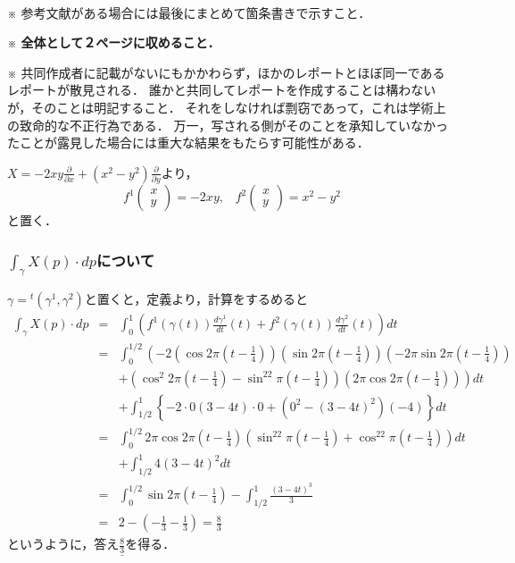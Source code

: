 \documentclass[dvipdfmx,nosetpagesize, uplatex]{jsarticle}
\theoremstyle{definition}
\theoremstyle{StatementsWithStar}
\theoremstyle{StatementsWithStar2}
\theoremstyle{StatementsWithStar3}
\theoremstyle{StatementsWithCCirc}
\theoremstyle{definition}
\begin{document}
\par
\ \par
\noindent
{\small
※ 参考文献がある場合には最後にまとめて箇条書きで示すこと．\par\noindent
※ \textbf{全体として２ページに収めること．}\par\noindent
※ 共同作成者に記載がないにもかかわらず，ほかのレポートとほぼ同一であるレポートが散見される．
誰かと共同してレポートを作成することは構わないが，そのことは明記すること．
それをしなければ剽窃であって，これは学術上の致命的な不正行為である．
万一，写される側がそのことを承知していなかったことが露見した場合には重大な結果をもたらす可能性がある．
}

\par
%
%
\noindent

$X=-2xy\frac{\partial}{\partial x}+(x^2-y^2)\frac{\partial}{\partial y}$より，
\[f^1\left(\begin{array}{c}x \\ y\end{array}\right)=-2xy,\;\;\; f^2\left(\begin{array}{c}x \\y\end{array}\right)=x^2-y^2\]
と置く．

\subsubsection*{$\int_{\gamma}X(p)\cdot dp$について}

$\gamma={}^t(\gamma^1,\gamma^2)$と置くと，定義より，計算をするめると
\begin{eqnarray*}
    \int_\gamma X(p)\cdot dp &=& \int^1_0 \left( f^1(\gamma(t))\frac{d\gamma^1}{dt}(t)+f^2(\gamma(t))\frac{d\gamma^2}{dt}(t) \right) dt \\
    &=& \int^{1/2}_0  \left( -2(\cos 2\pi(t-\frac{1}{4})) (\sin 2\pi(t-\frac{1}{4}))(-2\pi\sin 2\pi (t-\frac{1}{4})) \right.\\
    & & \left. + \left(\cos^2 2\pi (t-\frac{1}{4})-\sin^22\pi (t-\frac{1}{4}) \right) (2\pi\cos 2\pi (t-\frac{1}{4}))\right) dt \\
    & & + \int^1_{1/2} \left\{ -2\cdot 0(3-4t)\cdot 0 + (0^2-(3-4t)^2)(-4) \right\}dt \\
    &=& \int^{1/2}_0 2\pi\cos 2\pi (t-\frac{1}{4}) \left( \sin^22\pi (t-\frac{1}{4}) +\cos^22\pi (t-\frac{1}{4}) \right)dt \\
    & & + \int^1_{1/2} 4(3-4t)^2dt \\
    &=& \int^{1/2}_0\sin 2\pi (t-\frac{1}{4}) - \int^1_{1/2}\frac{(3-4t)^3}{3} \\
    &=& 2 - \left( -\frac{1}{3} - \frac{1}{3} \right) = \frac{8}{3}
\end{eqnarray*}
というように，答え$\underline{\frac{8}{3}}$を得る．
\end{document}
